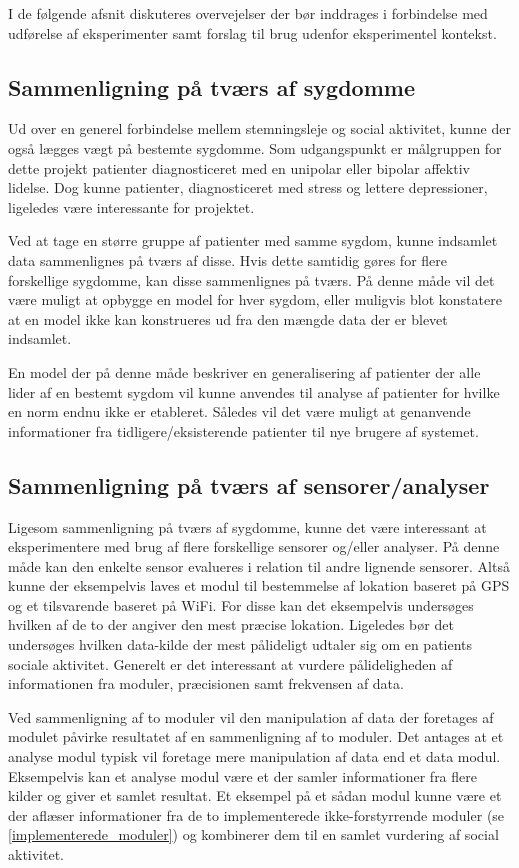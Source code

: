 I de følgende afsnit diskuteres overvejelser der bør inddrages i forbindelse med udførelse af eksperimenter samt forslag til brug udenfor eksperimentel kontekst.

\subsection{Sammenligning på tværs af sygdomme}\label{refleksion:tvaers_af_sygdomme}
Ud over en generel forbindelse mellem stemningsleje og social aktivitet, kunne der også lægges vægt på bestemte sygdomme.
Som udgangspunkt er målgruppen for dette projekt patienter diagnosticeret med en unipolar eller bipolar affektiv lidelse.
Dog kunne patienter, diagnosticeret med stress og lettere depressioner, ligeledes være interessante for projektet.

Ved at tage en større gruppe af patienter med samme sygdom, kunne indsamlet data sammenlignes på tværs af disse.
Hvis dette samtidig gøres for flere forskellige sygdomme, kan disse sammenlignes på tværs.
På denne måde vil det være muligt at opbygge en model for hver sygdom, eller muligvis blot konstatere at en model ikke kan konstrueres ud fra den mængde data der er blevet indsamlet.

En model der på denne måde beskriver en generalisering af patienter der alle lider af en bestemt sygdom vil kunne anvendes til analyse af patienter for hvilke en norm endnu ikke er etableret.
Således vil det være muligt at genanvende informationer fra tidligere/eksisterende patienter til nye brugere af systemet.

\subsection{Sammenligning på tværs af sensorer/analyser}
Ligesom sammenligning på tværs af sygdomme, kunne det være interessant at eksperimentere med brug af flere forskellige sensorer og/eller analyser.
På denne måde kan den enkelte sensor evalueres i relation til andre lignende sensorer.
Altså kunne der eksempelvis laves et modul til bestemmelse af lokation baseret på GPS og et tilsvarende baseret på WiFi.
For disse kan det eksempelvis undersøges hvilken af de to der angiver den mest præcise lokation.
Ligeledes bør det undersøges hvilken data-kilde der mest pålideligt udtaler sig om en patients sociale aktivitet.
Generelt er det interessant at vurdere pålideligheden af informationen fra moduler, præcisionen samt frekvensen af data.

Ved sammenligning af to moduler vil den manipulation af data der foretages af modulet påvirke resultatet af en sammenligning af to moduler.
Det antages at et analyse modul typisk vil foretage mere manipulation af data end et data modul.
Eksempelvis kan et analyse modul være et der samler informationer fra flere kilder og giver et samlet resultat.
Et eksempel på et sådan modul kunne være et der aflæser informationer fra de to implementerede ikke-forstyrrende moduler (se \cref{implementerede_moduler}) og kombinerer dem til en samlet vurdering af social aktivitet.

